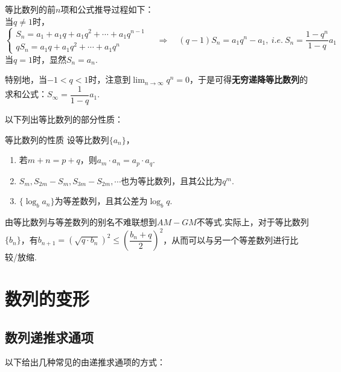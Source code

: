 \documentclass[lang=cn, zihao=4.5]{elegantbook}
\newcommand{\ssb}[1]{\left( #1 \right)}
\begin{document}
等比数列的前$n$项和公式推导过程如下： \\
当$q \neq 1$时，
$$\begin{cases}
	S_n = a_1 + a_1q + a_1q^2 + \cdots + a_1q^{n-1} \\
	qS_n = a_1q + a_1q^2 + \cdots + a_1q^{n} 
\end{cases}
\quad \Longrightarrow \quad
(q-1)S_n = a_1q^{n} - a_1,~i.e.~S_n = \frac{1-q^n}{1-q} a_1
$$
当$q = 1$时，显然$S_n = a_n$.

特别地，当$-1<q<1$时，注意到$\lim _{n \to \infty} q^n=0$，于是可得\textbf{无穷递降等比数列}的求和公式：$S_{\infty} = \dfrac{1}{1-q}a_1$.

以下列出等比数列的部分性质：

\begin{proposition}{等比数列的性质}
	设等比数列$\{ a_n \}$，
	\begin{enumerate}
		\item 若$m+n=p+q$，则$a_m \cdot a_n = a_p \cdot a_q$.
		\item $S_m,S_{2m}-S_m,S_{3m}-S_{2m},\cdots $也为等比数列，且其公比为$q^{m}$.
		\item $\{ \log _{b}{a_n} \}$为等差数列，且其公差为$\log _{b}{q}$.
	\end{enumerate}
\end{proposition}

由等比数列与等差数列的别名不难联想到$AM-GM$不等式.实际上，对于等比数列$\{ b_n \}$，有$b_{n+1} = (\sqrt{q \cdot b_n})^2 \leq \ssb{\dfrac{b_n+q}{2}}^2$，从而可以与另一个等差数列进行比较/放缩.

\section{数列的变形}

\subsection{数列递推求通项}

以下给出几种常见的由递推求通项的方式：
\end{document}
